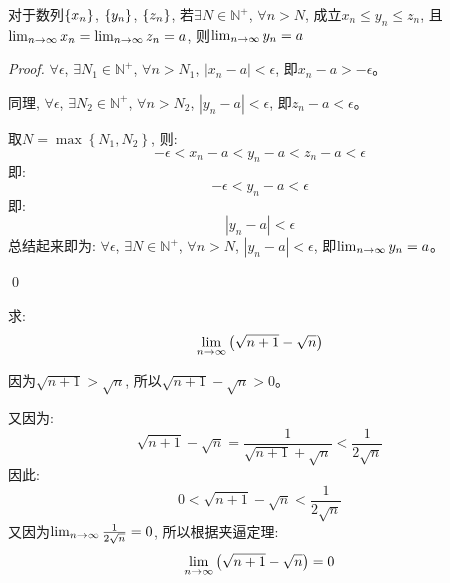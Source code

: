 \begin{theorem}[数列极限的夹逼性定理]
    对于数列$\left\{ x_n\right\}$, $\left\{ y_n\right\}$, $\left\{ z_n\right\}$, 若$\exists N \in \mathbb{N}^+$, $\forall n > N$, 成立$x_n \le y_n \le z_n$, 且$\lim_{n \to \infty } x_n = \lim_{n \to \infty } z_n = a$, 则$\lim_{n \to \infty } y_n = a$
\end{theorem}
\begin{proof}
    $\forall \epsilon$, $\exists N_1 \in \mathbb{N}^+$, $\forall n > N_1$, $\left| x_n - a\right| < \epsilon$, 即$x_n -a > -\epsilon$。

    同理, $\forall \epsilon$, $\exists N_2 \in \mathbb{N}^+$, $\forall n > N_2$, $\left| y_n - a\right| < \epsilon$, 即$z_n -a < \epsilon$。

    取$N = \max\left\{ N_1, N_2 \right\}$, 则:
    \begin{equation*}
        -\epsilon < x_n - a < y_n - a < z_n - a < \epsilon
    \end{equation*}
    即: 
    \begin{equation*}
        -\epsilon < y_n - a <\epsilon
    \end{equation*}
    即:
    \begin{equation*}
        \left| y_n - a \right| < \epsilon
    \end{equation*}
    总结起来即为:
    $\forall \epsilon$, $\exists N \in \mathbb{N}^+$, $\forall n > N$, $\left| y_n - a\right| < \epsilon$, 即$\lim_{n \to \infty } y_n = a$。

    \qed
\end{proof}
\begin{example}
    求: 
    \begin{equation*}
        \lim_{n \to \infty } \left(\sqrt{n+1} - \sqrt{n}\right)
    \end{equation*}
\end{example}
\begin{solution}
    因为$\sqrt{n+1} > \sqrt{n}$, 所以$\sqrt{n+1} - \sqrt{n} > 0$。

    又因为:
    \begin{equation*}
        \sqrt{n+1}-\sqrt{n} = \frac{1}{\sqrt{n+1}+\sqrt{n}} < \frac{1}{2\sqrt{n}}
    \end{equation*}
    因此:
    \begin{equation*}
        0 < \sqrt{n+1} - \sqrt{n} < \frac{1}{2\sqrt{n}}
    \end{equation*}
    又因为$\lim_{n \to \infty } \frac{1}{2\sqrt{n}} = 0$, 所以根据夹逼定理:
    \begin{equation*}
        \lim_{n \to \infty } \left(\sqrt{n+1}-\sqrt{n}\right) = 0
    \end{equation*}
\end{solution}
